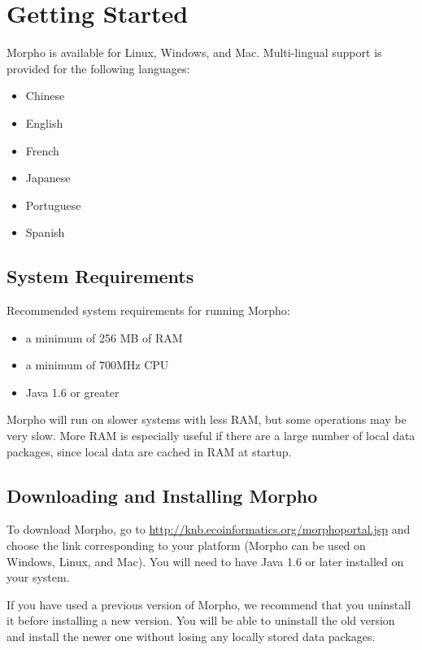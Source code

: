 \section{Getting Started}

Morpho is available for Linux, Windows, and Mac.
Multi-lingual support is provided for the following languages:
\begin{itemize}
 \item Chinese
 \item English
 \item French
 \item Japanese
 \item Portuguese
 \item Spanish
\end{itemize}

\subsection{System Requirements}

Recommended system requirements for running Morpho: 
\begin{itemize}
 \item a minimum of 256 MB of RAM 
 \item a minimum of 700MHz CPU 
 \item Java 1.6 or greater 
\end{itemize}

Morpho will run on slower systems with less RAM, but some operations may
be very slow. More RAM is especially useful if there are a large number
of local data packages, since local data are cached in RAM at startup. 

\subsection{Downloading and Installing Morpho}

To download Morpho, go to
\url{http://knb.ecoinformatics.org/morphoportal.jsp}
and choose the link corresponding to your platform (Morpho can be used
on Windows, Linux, and Mac). You will need to have Java 1.6 or later
installed on your system.

If you have used a previous version of Morpho, we recommend that you
uninstall it before installing a new version. You will be able to
uninstall the old version and install the newer one without losing any
locally stored data packages. 

